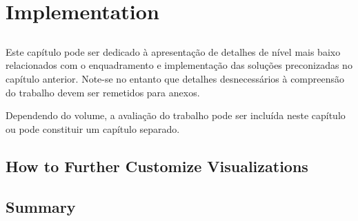 \chapter{Implementation}\label{chap:chap4}

\section*{}

Este capítulo pode ser dedicado à apresentação de detalhes de nível
mais baixo relacionados com o enquadramento e implementação das
soluções preconizadas no capítulo anterior.
Note-se no entanto que detalhes desnecessários à compreensão do
trabalho devem ser remetidos para anexos.

Dependendo do volume, a avaliação do trabalho pode ser incluída neste
capítulo ou pode constituir um capítulo separado.


\section{How to Further Customize Visualizations}



\section{Summary}


